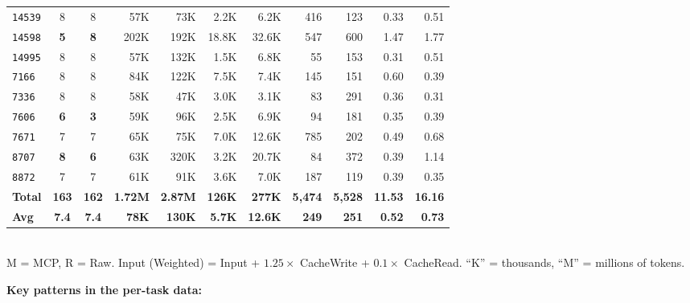 \begin{table}[!htbp]
\begin{tabular}{l cc rr rr rr rr}
\texttt{14539}  & 8 & 8 & 57K & 73K & 2.2K & 6.2K & 416 & 123 & 0.33 & 0.51 \\
\rowcolor{gray!15}
\texttt{14598}  & \textbf{5} & \textbf{8} & 202K & 192K & 18.8K & 32.6K & 547 & 600 & 1.47 & 1.77 \\
\texttt{14995}  & 8 & 8 & 57K & 132K & 1.5K & 6.8K & 55 & 153 & 0.31 & 0.51 \\
\texttt{7166}   & 8 & 8 & 84K & 122K & 7.5K & 7.4K & 145 & 151 & 0.60 & 0.39 \\
\texttt{7336}   & 8 & 8 & 58K & 47K & 3.0K & 3.1K & 83 & 291 & 0.36 & 0.31 \\
\rowcolor{gray!15}
\texttt{7606}   & \textbf{6} & \textbf{3} & 59K & 96K & 2.5K & 6.9K & 94 & 181 & 0.35 & 0.39 \\
\texttt{7671}   & 7 & 7 & 65K & 75K & 7.0K & 12.6K & 785 & 202 & 0.49 & 0.68 \\
\rowcolor{gray!15}
\texttt{8707}   & \textbf{8} & \textbf{6} & 63K & 320K & 3.2K & 20.7K & 84 & 372 & 0.39 & 1.14 \\
\texttt{8872}   & 7 & 7 & 61K & 91K & 3.6K & 7.0K & 187 & 119 & 0.39 & 0.35 \\
\midrule
\textbf{Total}  & \textbf{163} & \textbf{162}
                & \textbf{1.72M} & \textbf{2.87M}
                & \textbf{126K} & \textbf{277K}
                & \textbf{5{,}474} & \textbf{5{,}528}
                & \textbf{11.53} & \textbf{16.16} \\
\textbf{Avg}    & \textbf{7.4} & \textbf{7.4}
                & \textbf{78K} & \textbf{130K}
                & \textbf{5.7K} & \textbf{12.6K}
                & \textbf{249} & \textbf{251}
                & \textbf{0.52} & \textbf{0.73} \\
\bottomrule
\end{tabular}
\\[4pt]
{\footnotesize
M = MCP, R = Raw.\quad
Input (Weighted) = Input + $1.25 \times$ CacheWrite + $0.1 \times$ CacheRead.\quad
``K'' = thousands, ``M'' = millions of tokens.}
\end{table}

\noindent
\textbf{Key patterns in the per-task data:}


